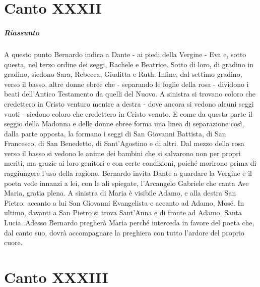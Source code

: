 \documentclass[a4paper, twoside, titlepage]{book}
\begin{document}
\chapter{Canto XXXII}

\paragraph{Riassunto} A questo punto Bernardo indica a Dante - ai piedi della Vergine - Eva e, sotto questa, nel terzo ordine dei seggi, Rachele e Beatrice. Sotto di loro, di gradino in gradino, siedono Sara, Rebecca, Giuditta e Ruth. Infine, dal settimo gradino, verso il basso, altre donne ebree che - separando le foglie della rosa - dividono i beati dell’Antico Testamento da quelli del Nuovo. A sinistra si trovano coloro che credettero in Cristo venturo mentre a destra - dove ancora si vedono alcuni seggi vuoti - siedono coloro che credettero in Cristo venuto. E come da questa parte il seggio della Madonna e delle donne ebree forma una linea di separazione così, dalla parte opposta, la formano i seggi di San Giovanni Battista, di San Francesco, di San Benedetto, di Sant’Agostino e di altri. Dal mezzo della rosa verso il basso si vedono le anime dei bambini che si salvarono non per propri meriti, ma grazie ai loro genitori e con certe condizioni, poiché morirono prima di raggiungere l’uso della ragione. Bernardo invita Dante a guardare la Vergine e il poeta vede innanzi a lei, con le ali spiegate, l’Arcangelo Gabriele che canta Ave Maria, gratia plena. A sinistra di Maria è visibile Adamo, e alla destra San Pietro: accanto a lui San Giovanni Evangelista e accanto ad Adamo, Mosé. In ultimo, davanti a San Pietro si trova Sant’Anna e di fronte ad Adamo, Santa Lucia. Adesso Bernardo pregherà Maria perché interceda in favore del poeta che, dal canto suo, dovrà accompagnare la preghiera con tutto l’ardore del proprio cuore.

\chapter{Canto XXXIII}
\end{document}
